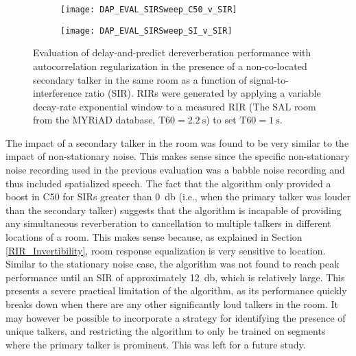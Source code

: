 \begin{figure}[H]
	\centering
	\begin{subfigure}[b]{0.47\textwidth}
		\centering
		\texttt{[image: DAP\_EVAL\_SIRSweep\_C50\_v\_SIR]}
	\end{subfigure}
	\begin{subfigure}[b]{0.92\textwidth}
		\centering
		\texttt{[image: DAP\_EVAL\_SIRSweep\_SI\_v\_SIR]}
	\end{subfigure}
	\caption[DAP evaluation with an interfering talker]{Evaluation of delay-and-predict dereverberation performance with autocorrelation regularization in the presence of a non-co-located secondary talker in the same room as a function of signal-to-interference ratio (SIR). RIRs were generated by applying a variable decay-rate exponential window to a measured RIR (The SAL room from the MYRiAD database, $\mathrm{T60} = \qty{2.2}{\second}$) to set $\mathrm{T60} = \qty{1}{\second}$.}
	\label{fig:DAP_EVAL_SIRSweep}
\end{figure}

The impact of a secondary talker in the room was found to be very similar to the impact of non-stationary noise. This makes sense since the specific non-stationary noise recording used in the previous evaluation was a babble noise recording and thus included spatialized speech. The fact that the algorithm only provided a boost in C50 for SIRs greater than  \qty{0}{\decibel} (i.e., when the primary talker was louder than the secondary talker) suggests that the algorithm is incapable of providing any simultaneous reverberation to cancellation to multiple talkers in different locations of a room. This makes sense because, as explained in Section \ref{RIR_Invertibility}, room response equalization is very sensitive to location. Similar to the stationary noise case, the algorithm was not found to reach peak performance until an SIR of approximately \qty{12}{\decibel}, which is relatively large. This presents a severe practical limitation of the algorithm, as its performance quickly breaks down when there are any other significantly loud talkers in the room. It may however be possible to incorporate a strategy for identifying the presence of unique talkers, and restricting the algorithm to only be trained on segments where the primary talker is prominent. This was left for a future study.